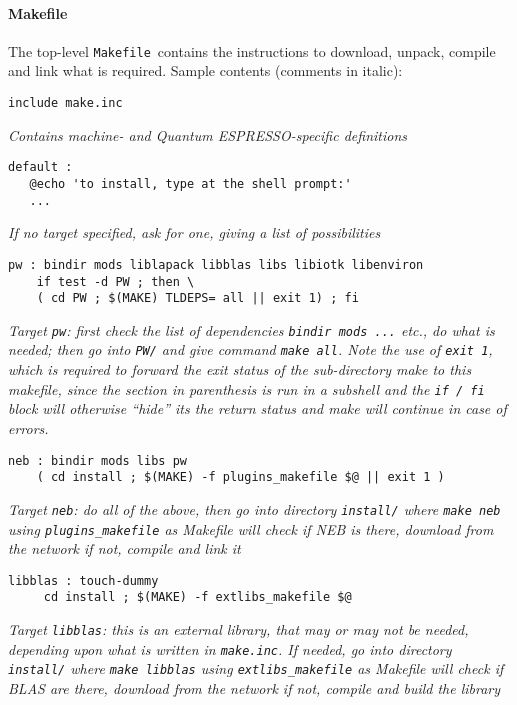 \documentclass[12pt,a4paper]{article}
\def\qe{{\sc Quantum ESPRESSO}}
\def\Makefile{\texttt{Makefile}}
\begin{document}
\paragraph{Makefile}
The top-level \Makefile\ contains the instructions to download,
unpack, compile and link what is required. Sample contents
(comments in italic):
\begin{verbatim}
include make.inc
\end{verbatim}
{\em Contains machine- and \qe-specific definitions}
\begin{verbatim}
default :
   @echo 'to install, type at the shell prompt:'
   ...
\end{verbatim}
{\em If no target specified, ask for one, giving a list of possibilities}
\begin{verbatim}
pw : bindir mods liblapack libblas libs libiotk libenviron
    if test -d PW ; then \
    ( cd PW ; $(MAKE) TLDEPS= all || exit 1) ; fi

\end{verbatim}
{\em Target {\tt pw}: first check the list of dependencies {\tt bindir
mods ...} etc., do what is needed; then go into {\tt PW/} and give command
{\tt make all}. Note the use of {\tt exit 1}, which is required to forward
the exit status of the sub-directory make to this makefile, since the section
in parenthesis is run in a subshell and the {\tt if / fi} block will otherwise
``hide'' its the return status and make will continue in case of errors. }
\begin{verbatim}
neb : bindir mods libs pw
    ( cd install ; $(MAKE) -f plugins_makefile $@ || exit 1 )
\end{verbatim}
{\em Target {\tt neb}: do all of the above, then go into directory
{\tt install/} where {\tt make neb} using {\tt plugins\_makefile}
as Makefile will check if NEB is there, download from the network if not,
compile and link it}
\begin{verbatim}
libblas : touch-dummy
     cd install ; $(MAKE) -f extlibs_makefile $@
\end{verbatim}
{\em Target {\tt libblas}: this is an external library, that may or may
not be needed, depending upon what is written in {\tt make.inc}. If
needed, go into directory {\tt install/} where {\tt make libblas} using
{\tt extlibs\_makefile} as Makefile will check if BLAS are there, download
from the network if not,
compile and build the library}
\end{document}
